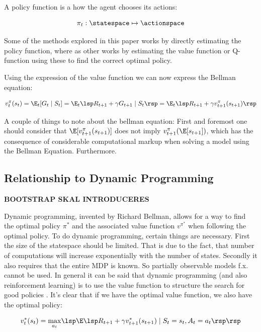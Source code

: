 A policy function is a how the agent chooses its actions:

\begin{equation}
    \pi_t : \statespace \mapsto \actionspace 
\end{equation}

Some of the methods explored in this paper works by directly estimating the policy function, where as other works by estimating the value function or Q-function using these to find the correct optimal policy.

Using the expression of the value function we can now express the Bellman equation:

\begin{equation}
    v^{\pi}_{t} (s_t) = \E_t [G_t \mid S_t] = \E_t  \lsp R_{t+1} + \gamma G_{t+1} \mid S_t \rsp = \E_t \lsp R_{t+1} + \gamma v_{t+1}^{\pi}(s_{t+1}) \rsp
\end{equation}

A couple of things to note about the bellman equation: First and foremost one should consider that $\E [v_{t+1}^\pi(s_{t+1})]$ does not imply $v_{t+1}^{\pi}(\E[s_{t+1}])$, which has the consequence of considerable computational markup when solving a model using the Bellman Equation. Furthermore.

\subsection{Relationship to Dynamic Programming}\label{sec:dynamic_programming}

\textbf{BOOTSTRAP SKAL INTRODUCERES}

Dynamic programming, invented by Richard Bellman, allows for a way to find the optimal policy $\pi^{*}$ and the associated value function $v^{\pi^{*}}$ when following the optimal policy. To do dynamic programming, certain things are necessary. First the size of the statespace should be limited. That is due to the fact, that number of computations will increase exponentially with the number of states. Secondly it also requires that the entire MDP is known. So partially observable models f.x. cannot be used. In general it can be said that dynamic programming (and also reinforcement learning) is to use the value function to structure the search for good policies  \parencite{sutton_reinforcement_2018}. It's clear that if we have the optimal value function, we also have the optimal policy:

\begin{equation}
    v_t^{*}(s_t) = \underset{a_t}{\max} \lsp \E \lsp R_{t+1} + \gamma v^{*}_{t+1}(s_{t+1}) \mid S_t = s_t, A_t = a_t\rsp \rsp
\end{equation}


